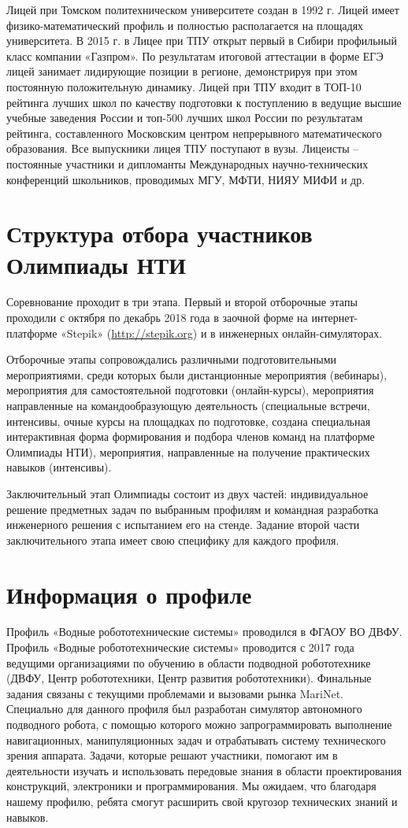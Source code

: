 Лицей при Томском политехническом университете создан в 1992 г. Лицей имеет физико-математический профиль и полностью располагается на площадях университета. В  2015 г.  в Лицее при ТПУ открыт первый в Сибири профильный класс компании «Газпром». По результатам итоговой аттестации в форме ЕГЭ  лицей занимает лидирующие позиции в регионе, демонстрируя при этом постоянную положительную динамику. Лицей при ТПУ входит  в ТОП-10  рейтинга лучших школ по качеству подготовки к поступлению в ведущие высшие учебные заведения России и топ-500 лучших школ России по результатам рейтинга, составленного Московским центром непрерывного математического образования. Все выпускники лицея ТПУ поступают в вузы. Лицеисты – постоянные участники и дипломанты Международных научно-технических конференций школьников, проводимых МГУ, МФТИ, НИЯУ МИФИ и др.

\section*{Структура отбора участников Олимпиады НТИ}

Соревнование проходит в три этапа. Первый и второй отборочные этапы проходили с октября по декабрь 2018 года в заочной форме на интернет-платформе «Stepik» (\url{http://stepik.org}) и в инженерных онлайн-симуляторах.

Отборочные этапы сопровождались различными подготовительными мероприятиями, среди которых были дистанционные мероприятия (вебинары), мероприятия для самостоятельной подготовки (онлайн-курсы), мероприятия направленные на командообразующую деятельность (специальные встречи, интенсивы, очные курсы на площадках по подготовке, создана специальная интерактивная форма формирования и подбора членов команд на платформе Олимпиады НТИ), мероприятия, направленные на получение практических навыков (интенсивы).

Заключительный этап Олимпиады состоит из двух частей: индивидуальное решение предметных задач по выбранным профилям и командная разработка инженерного решения с испытанием  его на стенде. Задание второй части заключительного этапа имеет свою специфику для каждого профиля.

\section*{Информация о профиле}

Профиль «Водные робототехнические системы» проводился в ФГАОУ ВО ДВФУ. Профиль «Водные робототехнические системы» проводится с 2017 года ведущими организациями по обучению в области подводной робототехнике (ДВФУ, Центр робототехники, Центр развития робототехники). Финальные задания связаны с текущими проблемами и вызовами рынка MariNet. Специально для данного профиля был разработан симулятор автономного подводного робота, с помощью которого можно запрограммировать выполнение навигационных, манипуляционных задач и отрабатывать систему технического зрения аппарата. Задачи, которые решают участники, помогают им в деятельности изучать и использовать передовые знания в области проектирования конструкций, электроники и программирования. Мы ожидаем, что благодаря нашему профилю, ребята смогут расширить свой кругозор технических знаний и навыков.

